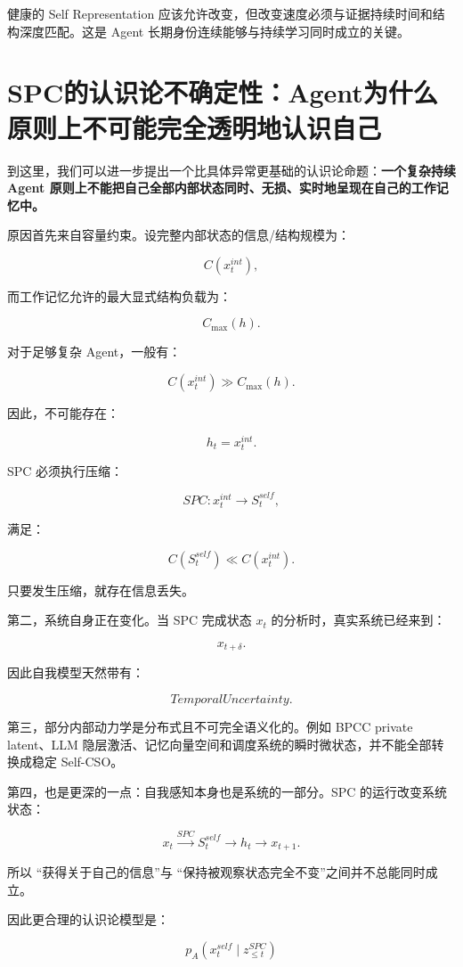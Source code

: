 健康的 Self Representation 应该允许改变，但改变速度必须与证据持续时间和结构深度匹配。这是 Agent 长期身份连续能够与持续学习同时成立的关键。

\section{SPC的认识论不确定性：Agent为什么原则上不可能完全透明地认识自己}

到这里，我们可以进一步提出一个比具体异常更基础的认识论命题：\textbf{一个复杂持续 Agent 原则上不能把自己全部内部状态同时、无损、实时地呈现在自己的工作记忆中。}

原因首先来自容量约束。设完整内部状态的信息/结构规模为：

\[
C(x_t^{int}),
\]

而工作记忆允许的最大显式结构负载为：

\[
C_{\max}(h).
\]

对于足够复杂 Agent，一般有：

\[
C(x_t^{int})
\gg
C_{\max}(h).
\]

因此，不可能存在：

\[
h_t=x_t^{int}.
\]

SPC 必须执行压缩：

\[
SPC:
x_t^{int}
\rightarrow
S_t^{self},
\]

满足：

\[
C(S_t^{self})
\ll
C(x_t^{int}).
\]

只要发生压缩，就存在信息丢失。

第二，系统自身正在变化。当 SPC 完成状态 $x_t$ 的分析时，真实系统已经来到：

\[
x_{t+\delta}.
\]

因此自我模型天然带有：

\[
TemporalUncertainty.
\]

第三，部分内部动力学是分布式且不可完全语义化的。例如 BPCC private latent、LLM 隐层激活、记忆向量空间和调度系统的瞬时微状态，并不能全部转换成稳定 Self-CSO。

第四，也是更深的一点：自我感知本身也是系统的一部分。SPC 的运行改变系统状态：

\[
x_t
\xrightarrow{SPC}
S_t^{self}
\rightarrow
h_t
\rightarrow
x_{t+1}.
\]

所以 ``获得关于自己的信息''与 ``保持被观察状态完全不变''之间并不总能同时成立。

因此更合理的认识论模型是：

\[
\boxed{
p_A
\left(
x_t^{self}
\mid
z_{\leq t}^{SPC}
\right)
}
\]

